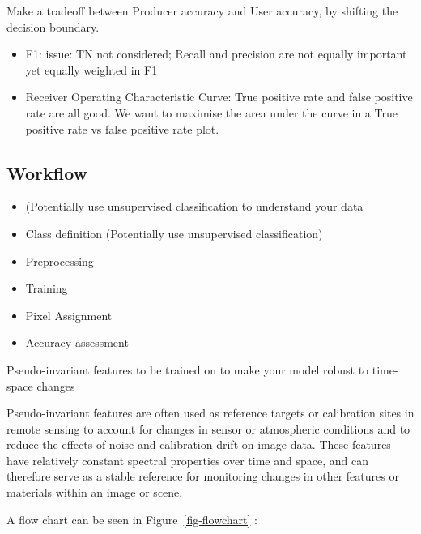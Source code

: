 \documentclass[
  letterpaper,
  DIV=11,
  numbers=noendperiod]{scrreprt}
\begin{document}
Make a tradeoff between Producer accuracy and User accuracy, by shifting
the decision boundary.

\begin{itemize}
\item
  F1: issue: TN not considered; Recall and precision are not equally
  important yet equally weighted in F1
\item
  Receiver Operating Characteristic Curve: True positive rate and false
  positive rate are all good. We want to maximise the area under the
  curve in a True positive rate vs false positive rate plot.
\end{itemize}

\hypertarget{workflow}{%
\subsection{Workflow}\label{workflow}}

\begin{itemize}
\item
  (Potentially use unsupervised classification to understand your data
\item
  Class definition (Potentially use unsupervised classification)
\item
  Preprocessing
\item
  Training
\item
  Pixel Assignment
\item
  Accuracy assessment
\end{itemize}

Pseudo-invariant features to be trained on to make your model robust to
time-space changes

Pseudo-invariant features are often used as reference targets or
calibration sites in remote sensing to account for changes in sensor or
atmospheric conditions and to reduce the effects of noise and
calibration drift on image data. These features have relatively constant
spectral properties over time and space, and can therefore serve as a
stable reference for monitoring changes in other features or materials
within an image or scene.

A flow chart can be seen in Figure~\ref{fig-flowchart} :
\end{document}
